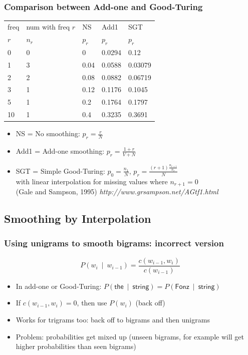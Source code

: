 \begin{frame}
\frametitle{Comparison between Add-one and Good-Turing}
\centering
\begin{tabular}{lllll}
\hline
freq & num with freq $r$ & NS    & Add1  & SGT   \\
$r$  & $n_r$ & $p_r$ & $p_r$ & $p_r$ \\
\hline
0  &  0 & 0    & 0.0294 & 0.12 \\
1  &  3 & 0.04 & 0.0588 & 0.03079 \\
2  &  2 & 0.08 & 0.0882 & 0.06719 \\
3  &  1 & 0.12 & 0.1176 & 0.1045 \\
5  &  1 & 0.2  & 0.1764 & 0.1797 \\
10 &  1 & 0.4  & 0.3235 & 0.3691 \\
\hline
\end{tabular}
\begin{itemize}[<+->]
\item NS = No smoothing: $p_r = \frac{r}{N}$
\item Add1 = Add-one smoothing: $p_r = \frac{1 + r}{V + N}$
\item SGT = Simple Good-Turing: $p_0 = \frac{n_1}{N}$, $p_r = \frac{(r+1) \frac{n_{r+1}}{n_r}}{N}$ \\
with linear interpolation for missing values where $n_{r+1} = 0$ \\
{\small (Gale and Sampson, 1995) \textit{http://www.grsampson.net/AGtf1.html}}
\end{itemize}
\end{frame}

\subsection{Smoothing by Interpolation}

\begin{frame}
\frametitle{Using unigrams to smooth bigrams: incorrect version}
\[ P(w_i~\mid~w_{i-1}) = \frac{ c(w_{i-1},w_i) } { c(w_{i-1}) } \]
\begin{itemize}[<+->]
\item In add-one or Good-Turing: $P(\textsf{the}~\mid~\textsf{string}) = P(\textsf{Fonz}~\mid~\textsf{string})$
\item If $c(w_{i-1},w_i) = 0$, then use $P(w_i)$ (back off)
\item Works for trigrams too: back off to bigrams and then unigrams
\item Problem: probabilities get mixed up (unseen bigrams, for example will get higher probabilities than seen bigrams)
\end{itemize}
\end{frame}


